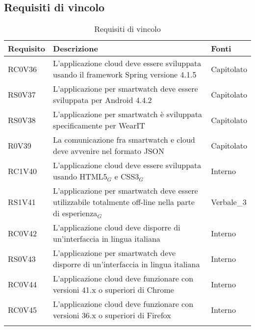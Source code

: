 \subsection{Requisiti di vincolo}
\begin{center}
\bgroup
\def\arraystretch{1.8}
\begin{longtable}{|l|p{7cm}|p{1.7cm}|} \hline
\textbf{Requisito} & \textbf{Descrizione} & \textbf{Fonti} \\\hline
RC0V36		& L'applicazione cloud deve essere sviluppata usando il framework Spring versione 4.1.5 & Capitolato \\\hline
RS0V37		& L'applicazione per smartwatch deve essere sviluppata per Android 4.4.2 & Capitolato \\\hline
RS0V38		& L'applicazione per smartwatch è sviluppata specificamente per WearIT & Capitolato \\\hline
R0V39		& La comunicazione fra smartwatch e cloud deve avvenire nel formato JSON & Capitolato \\\hline
RC1V40		& L'applicazione cloud deve essere sviluppata usando HTML5$_{G}$ e CSS3$_{G}$ & Interno \\\hline
RS1V41		& L'applicazione per smartwatch deve essere utilizzabile totalmente off-line nella parte di esperienza$_{G}$ & Verbale\_3 \\\hline
RC0V42		& L'applicazione cloud deve disporre di un'interfaccia in lingua italiana & Interno \\\hline
RS0V43		& L'applicazione per smartwatch deve disporre di un'interfaccia in lingua italiana & Interno \\\hline
RC0V44		& L'applicazione cloud deve funzionare con versioni 41.x o superiori di Chrome & Interno \\\hline
RC0V45		& L'applicazione cloud deve funzionare con versioni 36.x o superiori di Firefox & Interno \\\hline
\caption{Requisiti di vincolo}
\end{longtable}
\egroup
\end{center}

